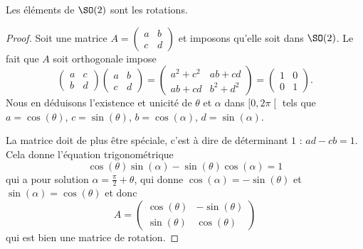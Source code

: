 \begin{lemma}       \label{LEMooHRESooQTrpMz}
    Les éléments de \( \SO(2)\) sont les rotations.
\end{lemma}

\begin{proof}
    Soit une matrice \( A=\begin{pmatrix}
        a    &   b    \\ 
        c    &   d    
    \end{pmatrix}\) et imposons qu'elle soit dans \( \SO(2)\). Le fait que \( A\) soit orthogonale impose
    \begin{equation}
        \begin{pmatrix}
            a    &   c    \\ 
            b    &   d    
        \end{pmatrix}\begin{pmatrix}
            a    &   b    \\ 
            c    &   d    
        \end{pmatrix}=\begin{pmatrix}
            a^2+c^2    &   ab+cd    \\ 
            ab+cd    &   b^2+d^2    
        \end{pmatrix}=\begin{pmatrix}
            1    &   0    \\ 
            0    &   1    
        \end{pmatrix}.
    \end{equation}
    Nous en déduisons l'existence et unicité de \( \theta\) et \( \alpha\) dans \( \mathopen[ 0 , 2\pi \mathclose[\) tels que \( a=\cos(\theta)\), \( c=\sin(\theta)\), \( b=\cos(\alpha)\), \( d=\sin(\alpha)\).

    La matrice doit de plus être spéciale, c'est à dire de déterminant \( 1\) : \( ad-cb=1\). Cela donne l'équation trigonométrique
    \begin{equation}
        \cos(\theta)\sin(\alpha)-\sin(\theta)\cos(\alpha)=1
    \end{equation}
    qui a pour solution \( \alpha=\frac{ \pi }{2}+\theta\), qui donne \( \cos(\alpha)=-\sin(\theta)\) et \( \sin(\alpha)=\cos(\theta)\) et donc
    \begin{equation}
        A=\begin{pmatrix}
            \cos(\theta)    &   -\sin(\theta)    \\ 
            \sin(\theta)    &   \cos(\theta)    
        \end{pmatrix}
    \end{equation}
    qui est bien une matrice de rotation.
\end{proof}

